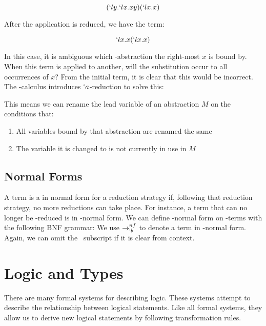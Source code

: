   \[
    (`ly.`lx.xy)(`lx.x)
  \]
 
  After the application is reduced, we have the term:
  
  \[
    `lx.x(`lx.x) 
  \]
  
  In this case, it is ambiguous which \lam-abstraction the right-most $x$
  is bound by. When this term is applied to another, will the substitution
  occur to all occurrences of $x$? From the initial term, it is clear that
  this would be incorrect. The \lam-calculus introduces $`a$-reduction to
  solve this:
  
  \begin{figure}[!h]\label{def:alpha-reduction}
  \end{figure}
 
  This means we can rename the lead variable of an abstraction $M$ on the 
  conditions that: 
  \begin{enumerate}
    \item All variables bound by that abstraction are renamed the same 
    \item The variable it is changed to is not currently in use in $M$ 
  \end{enumerate}
  
  
  \subsection{Normal Forms}
 
  A term is a in normal form for a reduction strategy if, 
  following that reduction strategy,
  no more reductions can take place.
  For instance, a term that can no longer be \bta-reduced is in \bta-normal form.
  We can define \bta-normal form on \lam-terms with the following BNF grammar:
  We use $\to_{`b}^{nf}$ to denote a term in \bta-normal form.
  Again, we can omit the \bta\ subscript if it is clear from context.

\section{Logic and Types}

  There are many formal systems for describing logic.
  These systems attempt to describe the relationship between logical statements.
  Like all formal systems, 
  they allow us to derive new logical statements by following transformation rules.

